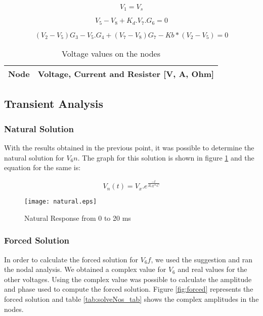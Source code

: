 \begin{equation}
  V_1 = V_s
  \label{eq_12}
\end{equation}

\begin{equation}
  V_5 - V_8 + K_d . V_7 . G_6 = 0
  \label{eq_13}
\end{equation}

\begin{equation}
  (V_2 - V_5) G_3 - V_5 . G_4 + (V_7 - V_8) G_7 - Kb * (V_2 - V_5) = 0
  \label{eq_14}
\end{equation}


\begin{table}[h]
  \centering
  \begin{tabular}{|l|r|}
    \hline    
    {\bf Node} & {\bf Voltage, Current and Resister [V, A, Ohm]} \\ \hline
    
  \end{tabular}
  \caption{Voltage values on the nodes}
  \label{tab:oct2_tab}
\end{table}

\newpage
\subsection{Transient Analysis}

\subsubsection{Natural Solution}

With the results obtained in the previous point, it was possible to determine the natural solution for $V_6n$. The graph for this solution is shown in figure \ref{fig:natural} and the equation for the same is:


\begin{equation}
  V_n(t) = V_x . e ^ \frac{-t}{R_eq * C}
  \label{eq_15}
\end{equation}


\begin{figure}[h] \centering
\texttt{[image: natural.eps]}
\caption{Natural Response from 0 to 20 ms}
\label{fig:natural}
\end{figure}


\subsubsection{Forced Solution}

In order to calculate the forced solution for $V_6f$, we used the suggestion and ran the nodal analysis. We obtained a complex value for $V_6$ and real values for the other voltages. Using the complex value was possible to calculate the amplitude and phase used to compute the forced solution. Figure \ref{fig:forced} represents the forced solution and table \ref{tab:solveNos_tab} shows the complex amplitudes in the nodes. 

